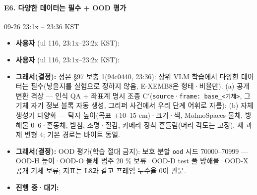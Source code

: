 \paragraph{E6. 다양한 데이터는 필수 + OOD 평가}
{\small 09-26 23:1x -- 23:36 KST}
\begin{itemize}
  \item \textbf{사용자} (ul 116, 23:1x--23:2x KST): 
  \item \textbf{사용자} (ul 116, 23:1x--23:2x KST): 
  \item \textbf{그래서(결정):} 정본 §97 보충 1(94c0440, 23:36): 상위 VLM 학습에서 다양한 데이터는 필수(넣을지를 실험으로 정하지 않음, E-XEMB8은 형태·비율만). (a) 공개 변환 격상 --- 인식 QA + 좌표계 명시 조종 C$'$(\texttt{source}·\texttt{frame: base\_\allowbreak{}<기체>}, 그 기체 자기 정보 블록 자동 생성, 그리퍼 사건에서 우리 단계 어휘로 자름); (b) 자체 생성기 다양화 --- 탁자 높이(목표 $\pm$10--15 cm)·크기·색, MolmoSpaces 물체, 방해물 0--6·혼동체, 받침, 조명·질감, 카메라 장착 흔들림(머리 각도는 고정), 새 과제 변형 4; 기본 경로는 바이트 동일.
  \item \textbf{그래서(결정):} OOD 평가(학습 절대 금지): 보호 분할 \texttt{ood} 시드 70000--70999 --- OOD-H 높이·OOD-O 물체 범주 20 \% 보류·OOD-D test 풀 방해물·OOD-X 공개 기체 보류; 지표는 L8과 같고 프레임 누수율 0이 관문.
  \item \textbf{진행 중·대기:} 
\end{itemize}

